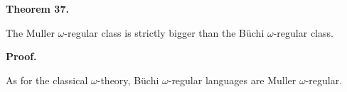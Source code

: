  
 
\par\medskip\noindent\textbf{Theorem 37.}\par
 
 
The Muller $\omega$-regular class is strictly bigger than the Büchi $\omega$-regular class.\par
 
 
 
 
\par\medskip\noindent\textbf{Proof.}\par
 
 
As for the classical $\omega$-theory, Büchi $\omega$-regular languages are Muller $\omega$-regular.\par
 
 
 
